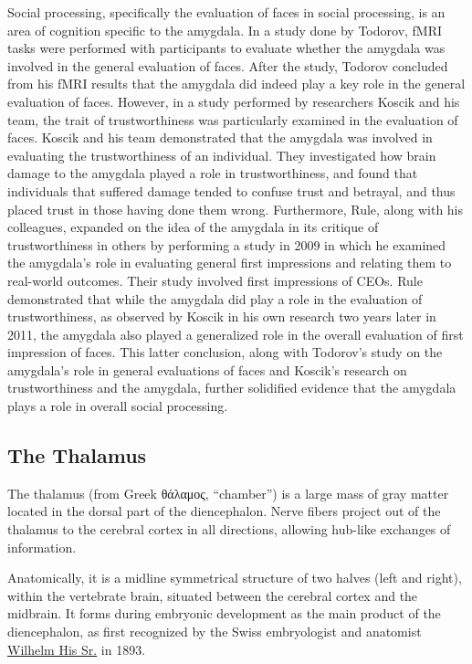 Social processing, specifically the evaluation of faces in social processing, is an area of cognition specific to the amygdala. In a study done by Todorov, fMRI tasks were performed with participants to evaluate whether the amygdala was involved in the general evaluation of faces. After the study, Todorov concluded from his fMRI results that the amygdala did indeed play a key role in the general evaluation of faces. However, in a study performed by researchers Koscik and his team, the trait of trustworthiness was particularly examined in the evaluation of faces. Koscik and his team demonstrated that the amygdala was involved in evaluating the trustworthiness of an individual. They investigated how brain damage to the amygdala played a role in trustworthiness, and found that individuals that suffered damage tended to confuse trust and betrayal, and thus placed trust in those having done them wrong. Furthermore, Rule, along with his colleagues, expanded on the idea of the amygdala in its critique of trustworthiness in others by performing a study in 2009 in which he examined the amygdala's role in evaluating general first impressions and relating them to real-world outcomes. Their study involved first impressions of CEOs. Rule demonstrated that while the amygdala did play a role in the evaluation of trustworthiness, as observed by Koscik in his own research two years later in 2011, the amygdala also played a generalized role in the overall evaluation of first impression of faces. This latter conclusion, along with Todorov's study on the amygdala's role in general evaluations of faces and Koscik's research on trustworthiness and the amygdala, further solidified evidence that the amygdala plays a role in overall social processing.

\hypertarget{the-thalamus}{%
\subsection{The Thalamus}\label{the-thalamus}}

The thalamus (from Greek θάλαμος, ``chamber'') is a large mass of gray matter located in the dorsal part of the diencephalon. Nerve fibers project out of the thalamus to the cerebral cortex in all directions, allowing hub-like exchanges of information.

Anatomically, it is a midline symmetrical structure of two halves (left and right), within the vertebrate brain, situated between the cerebral cortex and the midbrain. It forms during embryonic development as the main product of the diencephalon, as first recognized by the Swiss embryologist and anatomist \href{https://en.wikipedia.org/wiki/Wilhelm_His_Sr.}{Wilhelm His Sr.} in 1893.

